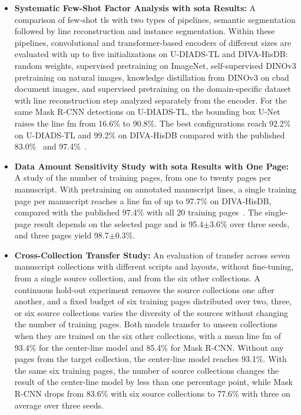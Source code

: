 \begin{itemize}
	\item \textbf{Systematic Few-Shot Factor Analysis with \gls{sota} Results:} A comparison of few-shot \gls{tls} with two types of pipelines, semantic segmentation followed by line reconstruction and instance segmentation. Within these pipelines, convolutional and transformer-based encoders of different sizes are evaluated with up to five initializations on U-DIADS-TL and DIVA-HisDB: random weights, supervised pretraining on ImageNet, self-supervised DINOv3 pretraining on natural images, knowledge distillation from DINOv3 on \gls{cbad} document images, and supervised pretraining on the domain-specific dataset with line reconstruction step analyzed separately from the encoder. For the same Mask R-CNN detections on U-DIADS-TL, the bounding box U-Net raises the line \gls{fm} from 16.6\% to 90.8\%. The best configurations reach 92.2\% on U-DIADS-TL and 99.2\% on DIVA-HisDB compared with the published 83.0\%~\cite{Zottin_2025_FEST} and 97.4\%~\cite{signals3030032}.
	
	\item \textbf{Data Amount Sensitivity Study with \gls{sota} Results with One Page:} A study of the number of training pages, from one to twenty pages per manuscript. With pretraining on annotated manuscript lines, a single training page per manuscript reaches a line \gls{fm} of up to 97.7\% on DIVA-HisDB, compared with the published 97.4\% with all 20 training pages~\cite{signals3030032}. The single-page result depends on the selected page and is 95.4\(\pm\)3.6\% over three seeds, and three pages yield 98.7\(\pm\)0.3\%.
	
	\item \textbf{Cross-Collection Transfer Study:} An evaluation of transfer across seven manuscript collections with different scripts and layouts, without fine-tuning, from a single source collection, and from the six other collections. A continuous hold-out experiment removes the source collections one after another, and a fixed budget of six training pages distributed over two, three, or six source collections varies the diversity of the sources without changing the number of training pages. Both models transfer to unseen collections when they are trained on the six other collections, with a mean line \gls{fm} of 93.4\% for the center-line model and 85.4\% for Mask R-CNN. Without any pages from the target collection, the center-line model reaches 93.1\%. With the same six training pages, the number of source collections changes the result of the center-line model by less than one percentage point, while Mask R-CNN drops from 83.6\% with six source collections to 77.6\% with three on average over three seeds.
\end{itemize}



